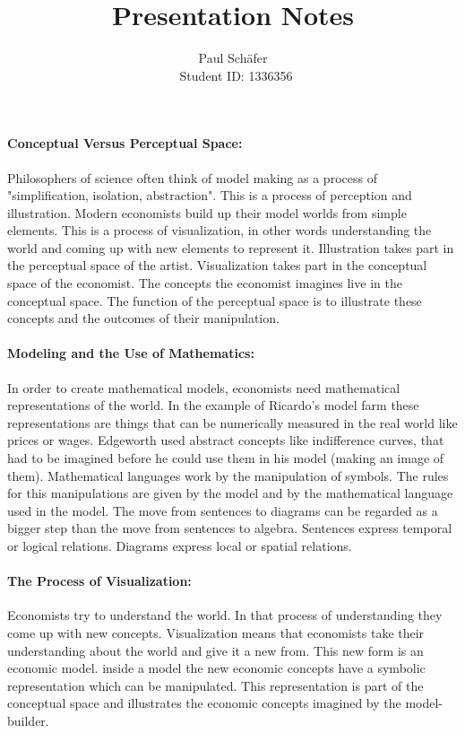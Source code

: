 \documentclass[12pt,a4paper]{article}
\author{Paul Sch\"afer \\\ Student ID: 1336356}
\begin{document}
\title{Presentation Notes}

\maketitle

\paragraph{Conceptual Versus Perceptual Space:}
Philosophers of science often think of model making as a process of "simplification, isolation, abstraction".
This is a process of perception and illustration.
Modern economists build up their model worlds from simple elements. This is a process of visualization, in other words understanding the world and coming up with new elements to represent it.
Illustration takes part in the perceptual space of the artist. Visualization takes part in the conceptual space of the economist.
The concepts the economist imagines live in the conceptual space.  The function of the perceptual space is to illustrate these concepts and the outcomes of their manipulation.

\paragraph{Modeling and the Use of Mathematics:}
In order to create mathematical models, economists need mathematical representations of the world. In the example of Ricardo's model farm these representations are things that can be numerically measured in the real world like prices or wages. Edgeworth used abstract concepts like indifference curves, that had to be imagined before he could use them in his model (making an image of them). 
Mathematical languages work by the manipulation of symbols. The rules for this manipulations are given by the model and by the mathematical language used in the model. 
The move from sentences to diagrams can be regarded as a bigger step than the move from sentences to algebra. Sentences express temporal or logical relations. Diagrams express local or spatial relations.

\paragraph{The Process of Visualization:}
Economists try to understand the world. In that process of understanding they come up with new concepts. Visualization means that economists take their understanding about the world and give it a new from. This new form is an economic model. inside a model the new economic concepts have a symbolic representation which can be manipulated. This representation is part of the conceptual space and illustrates the economic concepts imagined by the model-builder.
\end{document}
